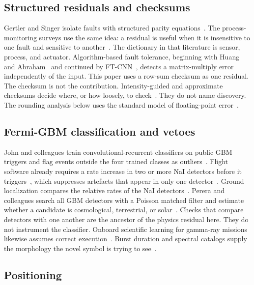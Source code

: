 \documentclass[preprint,12pt]{elsarticle}
\begin{document}
\subsection{Structured residuals and checksums}

Gertler and Singer isolate faults with structured parity equations~\cite{gertler1990}. The process-monitoring surveys use the same idea: a residual is useful when it is insensitive to one fault and sensitive to another~\cite{venkatasubramanian2003,isermann2005,chen1999}. The dictionary in that literature is sensor, process, and actuator. Algorithm-based fault tolerance, beginning with Huang and Abraham~\cite{huang1984} and continued by FT-CNN~\cite{zhao2021}, detects a matrix-multiply error independently of the input. This paper uses a row-sum checksum as one residual. The checksum is not the contribution. Intensity-guided and approximate checksums decide where, or how loosely, to check~\cite{kosaian2021,approxabft2023}. They do not name discovery. The rounding analysis below uses the standard model of floating-point error~\cite{higham2002,ieee754}.

\subsection{Fermi-GBM classification and vetoes}

John and colleagues train convolutional-recurrent classifiers on public GBM triggers and flag events outside the four trained classes as outliers~\cite{john2025}. Flight software already requires a rate increase in two or more NaI detectors before it triggers~\cite{meegan2009}, which suppresses artefacts that appear in only one detector~\cite{paciesas2012}. Ground localization compares the relative rates of the NaI detectors~\cite{goldstein2020,connaughton2015}. Perera and colleagues search all GBM detectors with a Poisson matched filter and estimate whether a candidate is cosmological, terrestrial, or solar~\cite{perera2025}. Checks that compare detectors with one another are the ancestor of the physics residual here. They do not instrument the classifier. Onboard scientific learning for gamma-ray missions likewise assumes correct execution~\cite{bulgarelli2025}. Burst duration and spectral catalogs supply the morphology the novel symbol is trying to see~\cite{kouveliotou1993,poolakkil2021,vonkienlin2020}.

\subsection{Positioning}
\end{document}
